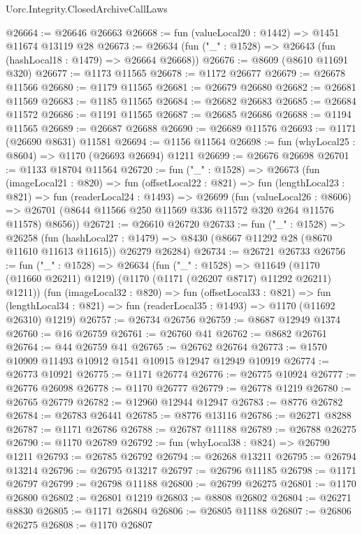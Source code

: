 \begin{lexlean}{Uorc.Integrity.ClosedArchiveCallLaws}
\begin{coremodule}
@26664 := @26646 @26663
@26668 := fun (valueLocal20 : @1442) => @1451 @11674 @13119 @28
@26673 := @26634 (fun ("_" : @1528) => @26643 (fun (hashLocal18 : @1479) => @26664 @26668))
@26676 := @8609 (@8610 @11691 @320)
@26677 := @1173 @11565
@26678 := @1172 @26677
@26679 := @26678 @11566
@26680 := @1179 @11565
@26681 := @26679 @26680
@26682 := @26681 @11569
@26683 := @1185 @11565
@26684 := @26682 @26683
@26685 := @26684 @11572
@26686 := @1191 @11565
@26687 := @26685 @26686
@26688 := @1194 @11565
@26689 := @26687 @26688
@26690 := @26689 @11576
@26693 := @1171 (@26690 @8631) @11581
@26694 := @1156 @11564
@26698 := fun (whyLocal25 : @8604) => @1170 (@26693 @26694) @1211
@26699 := @26676 @26698
@26701 := @1133 @18704 @11564
@26720 := fun ("_" : @1528) =>
  @26673
    (fun (imageLocal21 : @820) =>
    fun (offsetLocal22 : @821) =>
    fun (lengthLocal23 : @821) =>
    fun (readerLocal24 : @1493) =>
    @26699
      (fun (valueLocal26 : @8606) =>
      @26701 (@8644 @11566 @250 @11569 @336 @11572 @320 @264 @11576 @11578) @8656))
@26721 := @26610 @26720
@26733 := fun ("_" : @1528) =>
  @26258
    (fun (hashLocal27 : @1479) =>
    @8430 (@8667 @11292 @28 (@8670 @11610 @11613 @11615)) @26279 @26284)
@26734 := @26721 @26733
@26756 := fun ("_" : @1528) =>
  @26634
    (fun ("_" : @1528) =>
    @11649 (@1170 (@11660 @26211) @1219) (@1170 (@1171 (@26207 @8717) @11292 @26211) @1211))
    (fun (imageLocal32 : @820) =>
    fun (offsetLocal33 : @821) =>
    fun (lengthLocal34 : @821) => fun (readerLocal35 : @1493) => @1170 (@11692 @26310) @1219)
@26757 := @26734 @26756
@26759 := @8687 @12949 @1374
@26760 := @16 @26759
@26761 := @26760 @41
@26762 := @8682 @26761
@26764 := @44 @26759 @41
@26765 := @26762 @26764
@26773 := @1570 @10909 @11493 @10912 @1541 @10915 @12947 @12949 @10919
@26774 := @26773 @10921
@26775 := @1171 @26774
@26776 := @26775 @10924
@26777 := @26776 @26098
@26778 := @1170 @26777
@26779 := @26778 @1219
@26780 := @26765 @26779
@26782 := @12960 @12944 @12947
@26783 := @8776 @26782
@26784 := @26783 @26441
@26785 := @8776 @13116
@26786 := @26271 @8288
@26787 := @1171 @26786
@26788 := @26787 @11188
@26789 := @26788 @26275
@26790 := @1170 @26789
@26792 := fun (whyLocal38 : @824) => @26790 @1211
@26793 := @26785 @26792
@26794 := @26268 @13211
@26795 := @26794 @13214
@26796 := @26795 @13217
@26797 := @26796 @11185
@26798 := @1171 @26797
@26799 := @26798 @11188
@26800 := @26799 @26275
@26801 := @1170 @26800
@26802 := @26801 @1219
@26803 := @8808 @26802
@26804 := @26271 @8830
@26805 := @1171 @26804
@26806 := @26805 @11188
@26807 := @26806 @26275
@26808 := @1170 @26807

\end{coremodule}
\end{lexlean}
